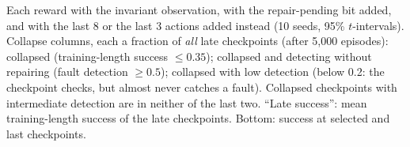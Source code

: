 \begin{table}[t]
\centering
\small
\setlength{\tabcolsep}{3pt}
\caption{Each reward with the invariant observation, with the repair-pending bit added, and with the last 8 or the last 3 actions added instead (10 seeds, 95\% $t$-intervals). Collapse columns, each a fraction of \emph{all} late checkpoints (after 5{,}000 episodes): collapsed (training-length success $\le 0.35$); collapsed and detecting without repairing (fault detection $\ge 0.5$); collapsed with low detection (below 0.2: the checkpoint checks, but almost never catches a fault). Collapsed checkpoints with intermediate detection are in neither of the last two. ``Late success'': mean training-length success of the late checkpoints. Bottom: success at selected and last checkpoints.}
\label{tab:pending}


\medskip
\resizebox{\linewidth}{!}{}
\end{table}

